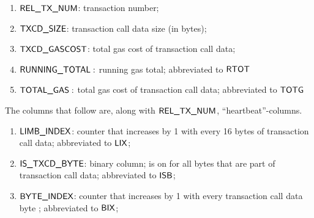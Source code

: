 \begin{enumerate}
	\item $\textsf{REL\_TX\_NUM}$: transaction number;
	\item $\textsf{TXCD\_SIZE}$: transaction call data size (in bytes);
	\item $\textsf{TXCD\_GASCOST}$: total gas cost of transaction call data;
	\item $\textsf{RUNNING\_TOTAL}:$ running gas total; abbreviated to $\textsf{RTOT}$
	\item $\textsf{TOTAL\_GAS}:$ total gas cost of transaction call data; abbreviated to $\textsf{TOTG}$
\end{enumerate}
The columns that follow are, along with $\textsf{REL\_TX\_NUM}$, ``heartbeat''-columns.
\begin{enumerate}[resume]
	\item $\textsf{LIMB\_INDEX}$: counter that increases by 1 with every 16 bytes of transaction call data; abbreviated to $\textsf{LIX}$;
	\item $\textsf{IS\_TXCD\_BYTE}$: binary column; is on for all bytes that are part of transaction call data; abbreviated to $\textsf{ISB}$;
	\item $\textsf{BYTE\_INDEX}$: counter that increases by 1 with every transaction call data byte ; abbreviated to $\textsf{BIX}$;
\end{enumerate}
